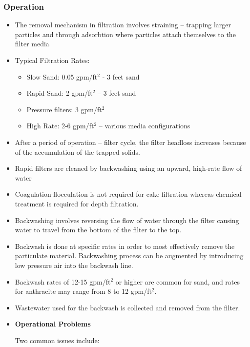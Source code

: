 \subsubsection{Operation}
\begin{itemize}
\item The removal mechanism in filtration involves straining – trapping larger particles and through adsorbtion where particles attach themselves to the filter media
\item Typical Filtration Rates:
\begin{itemize}
\item Slow Sand: 0.05 gpm/ft$^2$ - 3 feet sand
\item Rapid Sand: 2 gpm/ft$^2$ – 3 feet sand
\item Pressure filters: 3 gpm/ft$^2$
\item High Rate: 2-6 gpm/ft$^2$ – various media configurations
\end{itemize}

\item After a period of operation – filter cycle, the filter headloss increases because of the accumulation of the trapped solids.
\item Rapid filters are cleaned by backwashing using an upward, high-rate flow of water

\item Coagulation-flocculation is not required for cake filtration whereas chemical treatment is required for depth filtration.
\item Backwashing involves reversing the flow of water through the filter causing water to travel from the bottom of the filter to the top. 
\item Backwash is done at specific rates in order to most effectively remove the particulate material.  Backwashing process can be augmented by introducing low pressure air into the backwash line.
\item Backwash rates of 12-15 gpm/ft$^2$ or higher are common for sand, and rates for anthracite may range from 8 to 12 gpm/ft$^2$.
\item Wastewater used for the backwash is collected and removed from the filter. 






\item \textbf{Operational Problems}

Two common issues include:

\begin{itemize}


\end{itemize}
\end{itemize}
